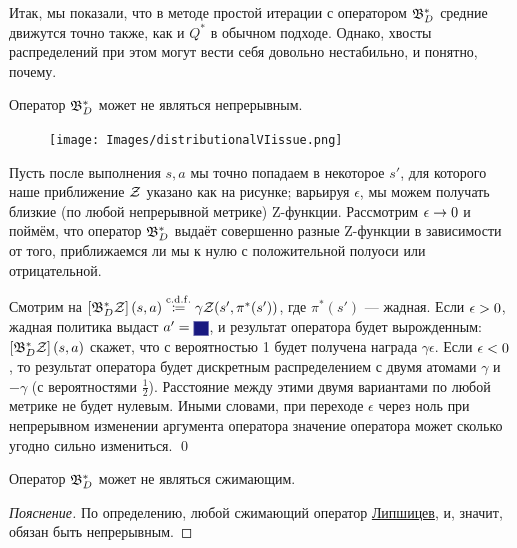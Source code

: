 Итак, мы показали, что в методе простой итерации с оператором $\mathfrak{B}^*_D$ средние движутся точно также, как и $Q^*$ в обычном подходе. Однако, хвосты распределений при этом могут вести себя довольно нестабильно, и понятно, почему.

\begin{theorem}
Оператор $\mathfrak{B}^*_D$ может не являться непрерывным.

\begin{figure}
\vspace{-1cm}
\centering
\texttt{[image: Images/distributionalVIissue.png]}
\vspace{0.2cm}
\end{figure}
\beginproof
Пусть после выполнения $s, a$ мы точно попадаем в некоторое $s'$, для которого наше приближение $\mathcal{Z}$ указано как на рисунке; варьируя $\epsilon$, мы можем получать близкие (по любой непрерывной метрике) Z-функции. Рассмотрим $\epsilon \HM\to 0$ и поймём, что оператор $\mathfrak{B}^*_D$ выдаёт совершенно разные Z-функции в зависимости от того, приближаемся ли мы к нулю с положительной полуоси или отрицательной.

Смотрим на $\left[ \B^*_D \Z \right](s, a) \HM\cdfcoloneqq \gamma \Z(s', \pi^*(s'))$, где $\pi^*(s')$ --- жадная. Если $\epsilon \HM> 0$, жадная политика выдаст $a' \HM= \text{\colorsquare{ChadBlue}}$, и результат оператора будет вырожденным: $\left[ \mathfrak{B}^*_D \mathcal{Z} \right](s, a)$ скажет, что с вероятностью 1 будет получена награда $\gamma \epsilon$. Если $\epsilon \HM< 0$, то результат оператора будет дискретным распределением с двумя атомами $\gamma$ и $-\gamma$ (с вероятностями $\frac{1}{2}$). Расстояние между этими двумя вариантами по любой метрике не будет нулевым. Иными словами, при переходе $\epsilon$ через ноль при непрерывном изменении аргумента оператора значение оператора может сколько угодно сильно измениться. \qed
\end{theorem}

\begin{proposition}
Оператор $\mathfrak{B}^*_D$ может не являться сжимающим.
\begin{proof}[Пояснение] По определению, любой сжимающий оператор \href{https://ru.wikipedia.org/wiki/\%D0\%9B\%D0\%B8\%D0\%BF\%D1\%88\%D0\%B8\%D1\%86\%D0\%B5\%D0\%B2\%D0\%BE_\%D0\%BE\%D1\%82\%D0\%BE\%D0\%B1\%D1\%80\%D0\%B0\%D0\%B6\%D0\%B5\%D0\%BD\%D0\%B8\%D0\%B5}{Липшицев}, и, значит, обязан быть непрерывным.
\end{proof}
\end{proposition}

